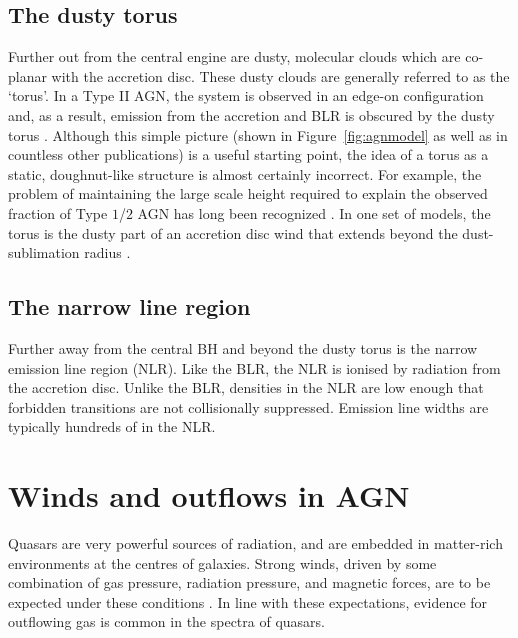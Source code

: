 \subsection{The dusty torus}

Further out from the central engine are dusty, molecular clouds which are co-planar with the accretion disc. 
These dusty clouds are generally referred to as the `torus'. 
In a Type II AGN, the system is observed in an edge-on configuration and, as a result, emission from the accretion and BLR is obscured by the dusty torus \citep[e.g.][]{antonucci93}.
Although this simple picture (shown in Figure~\ref{fig:agnmodel} as well as in countless other publications) is a useful starting point, the idea of a torus as a static, doughnut-like structure is almost certainly incorrect. 
For example, the problem of maintaining the large scale height required to explain the observed fraction of Type $1$/$2$ AGN has long been recognized \citep[e.g.][]{krolik88}. 
In one set of models, the torus is the dusty part of an accretion disc wind that extends beyond the dust-sublimation radius \citep[e.g.][]{konigl94,everett09,gallagher12,everett05,keating12,elitzur06}. 

\subsection{The narrow line region}

Further away from the central BH and beyond the dusty torus is the narrow emission line region (NLR). 
Like the BLR, the NLR is ionised by radiation from the accretion disc. 
Unlike the BLR, densities in the NLR are low enough that forbidden transitions are not collisionally suppressed. 
Emission line widths are typically hundreds of \kms in the NLR. 

\section{Winds and outflows in AGN}

Quasars are very powerful sources of radiation, and are embedded in matter-rich environments at the centres of galaxies.
Strong winds, driven by some combination of gas pressure, radiation pressure, and magnetic forces, are to be expected under these conditions \citep[e.g.][]{blandford82b,proga00,everett05}. 
In line with these expectations, evidence for outflowing gas is common in the spectra of quasars. 

